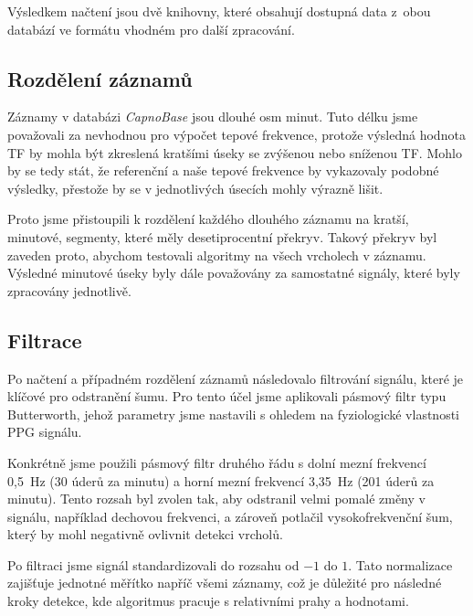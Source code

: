 Výsledkem načtení jsou dvě knihovny, které obsahují dostupná data z~obou databází ve formátu vhodném pro další zpracování.

\subsection*{Rozdělení záznamů}
\label{sec:alg_split}
Záznamy v databázi \emph{CapnoBase} jsou dlouhé osm minut.
Tuto délku jsme považovali za nevhodnou pro výpočet tepové frekvence, protože výsledná hodnota TF by mohla být zkreslená kratšími úseky se zvýšenou nebo sníženou TF.
Mohlo by se tedy stát, že referenční a naše tepové frekvence by vykazovaly podobné výsledky, přestože by se v jednotlivých úsecích mohly výrazně lišit.

Proto jsme přistoupili k rozdělení každého dlouhého záznamu na kratší, minutové, segmenty, které měly desetiprocentní překryv.
Takový překryv byl zaveden proto, abychom testovali algoritmy na všech vrcholech v záznamu.
Výsledné minutové úseky byly dále považovány za samostatné signály, které byly zpracovány jednotlivě.

\subsection*{Filtrace}
\label{sec:alg_filter}
Po načtení a případném rozdělení záznamů následovalo filtrování signálu, které je klíčové pro odstranění šumu.
Pro tento účel jsme aplikovali pásmový filtr typu Butterworth, jehož parametry jsme nastavili s ohledem na fyziologické vlastnosti PPG signálu.

Konkrétně jsme použili pásmový filtr druhého řádu s dolní mezní frekvencí 0,5~Hz (30 úderů za minutu) a horní mezní frekvencí 3,35~Hz (201 úderů za minutu).
Tento rozsah byl zvolen tak, aby odstranil velmi pomalé změny v signálu, například dechovou frekvenci, a zároveň potlačil vysokofrekvenční šum, který by mohl negativně ovlivnit detekci vrcholů.

Po filtraci jsme signál standardizovali do rozsahu od \(-1\) do \(1\).
Tato normalizace zajišťuje jednotné měřítko napříč všemi záznamy, což je důležité pro následné kroky detekce, kde algoritmus pracuje s relativními prahy a hodnotami.

